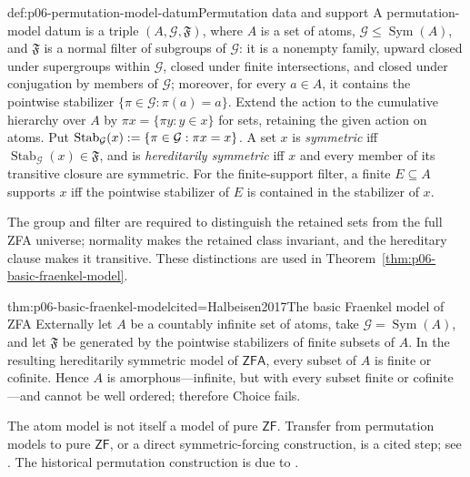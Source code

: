 \begin{hbdefinition}{def:p06-permutation-model-datum}{Permutation data and support}
A permutation-model datum is a triple \((A,\mathcal G,\mathfrak F)\), where
\(A\) is a set of atoms, \(\mathcal G\leq\operatorname{Sym}(A)\), and
\(\mathfrak F\) is a normal filter of subgroups of \(\mathcal G\): it is a
nonempty family, upward closed under supergroups within \(\mathcal G\), closed
under finite intersections, and closed under conjugation by members of
\(\mathcal G\); moreover, for every \(a\in A\), it contains the pointwise
  stabilizer \(\{\pi\in\mathcal G:\pi(a)=a\}\).  Extend the action to the
  cumulative hierarchy over \(A\) by
\(\pi x=\{\pi y:y\in x\}\) for sets, retaining the given action on atoms.  Put
\(\operatorname{Stab}_{\mathcal G}(x)
 \mathrel{:=}\{\pi\in\mathcal G:\pi x=x\}\).  A set \(x\) is
\emph{symmetric} iff \(\operatorname{Stab}_{\mathcal G}(x)\in\mathfrak F\), and is
\emph{hereditarily symmetric} iff \(x\) and every member of its transitive
closure are symmetric.  For the finite-support filter, a finite
\(E\subseteq A\) supports
\(x\) iff the pointwise stabilizer of \(E\) is contained in the stabilizer of
\(x\).

The group and filter are required to distinguish the retained sets from the
full ZFA universe; normality makes the retained class invariant, and the
hereditary clause makes it transitive.  These distinctions are used in
Theorem~\ref{thm:p06-basic-fraenkel-model}.
\end{hbdefinition}

\begin{hbtheorem}{thm:p06-basic-fraenkel-model}{cited=Halbeisen2017}{The basic Fraenkel model of ZFA}
Externally let \(A\) be a countably infinite set of atoms, take
\(\mathcal G=\operatorname{Sym}(A)\), and let \(\mathfrak F\) be generated by
the pointwise stabilizers of finite subsets of \(A\).  In the resulting
hereditarily symmetric model of \(\mathsf{ZFA}\), every subset of \(A\) is
finite or cofinite.  Hence \(A\) is amorphous---infinite, but with every subset
finite or cofinite---and cannot be well ordered; therefore Choice fails.
\end{hbtheorem}

The atom model is not itself a model of pure \(\mathsf{ZF}\).  Transfer from
permutation models to pure \(\mathsf{ZF}\), or a direct symmetric-forcing
construction, is a cited step; see \textcite{Jech1973Choice,Halbeisen2017}.
The historical permutation construction is due to \textcite{Fraenkel1922}.

